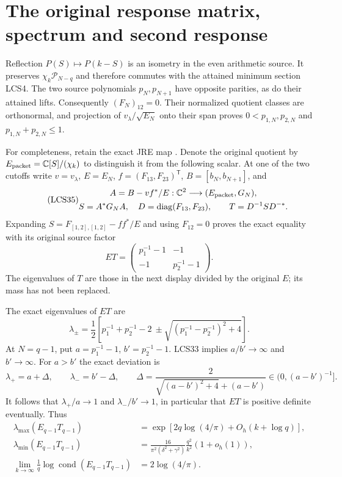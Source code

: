 \documentclass[11pt]{article}
\newcommand{\C}{\mathbb C}\newcommand{\R}{\mathbb R}
\newcommand{\PP}{\mathcal P}
\DeclareMathOperator{\cond}{cond}
\begin{document}
\section{The original response matrix, spectrum and second response}

Reflection $P(S)\mapsto P(k-S)$ is an isometry in the even
arithmetic source. It preserves $\chi_k\PP_{N-q}$ and therefore
commutes with the attained minimum section LCS4. The two source
polynomials $p_N,p_{N+1}$ have opposite parities, as do their
attained lifts. Consequently $(F_N)_{12}=0$. Their normalized
quotient classes are orthonormal, and projection of
$v_\lambda/\sqrt{E_N}$ onto their span proves
$0<p_{1,N},p_{2,N}$ and $p_{1,N}+p_{2,N}\le1$.

For completeness, retain the exact JRE map \cite{jre}. Denote
the original quotient by $E_{\rm packet}=\C[S]/(\chi_k)$ to
distinguish it from the following scalar. At one
of the two cutoffs write $v=v_\lambda$, $E=E_N$,
$f=(F_{13},F_{23})^{\mathsf T}$, $B=[b_N,b_{N+1}]$, and
\begin{equation}\tag{LCS35}
\begin{gathered}
 A=B-vf^*/E:\C^2\longrightarrow(E_{\rm packet},G_N),\\
 S=A^*G_NA,\quad D=\operatorname{diag}(F_{13},F_{23}),\qquad
 T=D^{-1}SD^{-*}.
\end{gathered}
\end{equation}
Expanding $S=F_{[1,2],[1,2]}-ff^*/E$ and using $F_{12}=0$
proves the exact equality with its original source factor
\begin{equation}\tag{LCS36}
 \boxed{ET=\begin{pmatrix}p_1^{-1}-1&-1\\-1&p_2^{-1}-1\end{pmatrix}.}
\end{equation}
The eigenvalues of $T$ are those in the next display divided by
the original $E$; its mass has not been replaced.

The exact eigenvalues of $ET$ are
\begin{equation}\tag{LCS37}
 \lambda_\pm=\frac12\left[p_1^{-1}+p_2^{-1}-2
       \ \pm\sqrt{(p_1^{-1}-p_2^{-1})^2+4}\right].
\end{equation}
At $N=q-1$, put $a=p_1^{-1}-1$, $b'=p_2^{-1}-1$.
LCS33 implies $a/b'\to\infty$ and $b'\to\infty$.
For $a>b'$ the exact deviation is
\[
 \lambda_+=a+\Delta,\qquad\lambda_-=b'-\Delta,\qquad
 \Delta=\frac{2}{\sqrt{(a-b')^2+4}+(a-b')}
       \in(0,(a-b')^{-1}].
\]
It follows that $\lambda_+/a\to1$ and $\lambda_-/b'\to1$,
in particular that $ET$ is positive definite eventually. Thus
\begin{equation}\tag{LCS38}
\boxed{\begin{aligned}
 \lambda_{\max}(E_{q-1}T_{q-1})
    &=\exp[2q\log(4/\pi)+O_h(k+\log q)],\\
 \lambda_{\min}(E_{q-1}T_{q-1})
    &=\frac{16}{\pi^2(\delta^2+\gamma^2)}
                    \frac{q^2}{k^2}(1+o_h(1)),\\
 \lim_{k\to\infty}\frac1q\log\cond(E_{q-1}T_{q-1})
    &=2\log(4/\pi).
\end{aligned}}
\end{equation}
\end{document}
